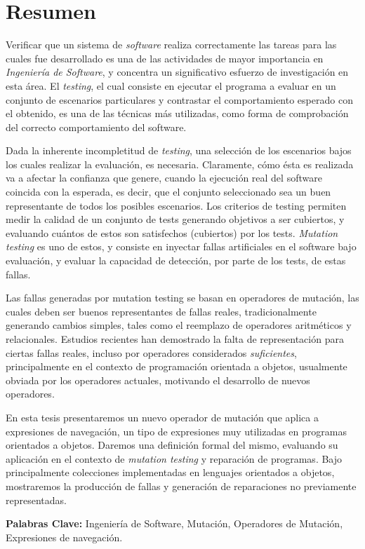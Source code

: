 \chapter*{Resumen}
Verificar que un sistema de \emph{software} realiza correctamente las tareas para las cuales fue desarrollado es una de las actividades de mayor importancia en \emph{Ingenier\'ia de Software}, y concentra un significativo esfuerzo de investigaci\'on en esta \'area. El \emph{testing}, el cual consiste en ejecutar el programa a evaluar en un conjunto de escenarios particulares y contrastar el comportamiento esperado con el obtenido, es una de las t\'ecnicas m\'as utilizadas, como forma de comprobaci\'on del correcto comportamiento del software.

Dada la inherente incompletitud de \emph{testing}, una selecci\'on de los escenarios bajos los cuales realizar la evaluaci\'on, es necesaria. Claramente, c\'omo \'esta es realizada va a afectar la confianza que genere, cuando la ejecuci\'on real del software coincida con la esperada, es decir, que el conjunto seleccionado sea un buen representante de todos los posibles escenarios. Los criterios de testing permiten medir la calidad de un conjunto de tests generando objetivos a ser cubiertos, y evaluando cu\'antos de estos son satisfechos (cubiertos) por los tests. \emph{Mutation testing} es uno de estos, y consiste en inyectar fallas artificiales en el software bajo evaluaci\'on, y evaluar la capacidad de detecci\'on, por parte de los tests, de estas fallas.

Las fallas generadas por mutation testing se basan en operadores de mutaci\'on, las cuales deben ser buenos representantes de fallas reales, tradicionalmente generando cambios simples, tales como el reemplazo de operadores aritm\'eticos y relacionales. Estudios recientes han demostrado la falta de representaci\'on para ciertas fallas reales, incluso por operadores considerados \emph{suficientes}, principalmente en el contexto de programaci\'on orientada a objetos, usualmente obviada por los operadores actuales, motivando el desarrollo de nuevos operadores.

En esta tesis presentaremos un nuevo operador de mutaci\'on que aplica a expresiones de navegaci\'on, un tipo de expresiones muy utilizadas en programas orientados a objetos. Daremos una definici\'on formal del mismo, evaluando su aplicaci\'on en el contexto de \emph{mutation testing} y reparaci\'on de programas. Bajo principalmente colecciones implementadas en lenguajes orientados a objetos, mostraremos la producci\'on de fallas y generaci\'on de reparaciones no previamente representadas.

\noindent
\textbf{Palabras Clave:} Ingenier\'ia de Software, Mutaci\'on, Operadores de Mutaci\'on, Expresiones de navegaci\'on.







